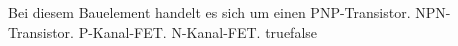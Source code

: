     {Bei diesem Bauelement handelt es sich um einen }
    {PNP-Transistor.}
    {NPN-Transistor.}
    {P-Kanal-FET.}
    {N-Kanal-FET.}
    {true}{false}
